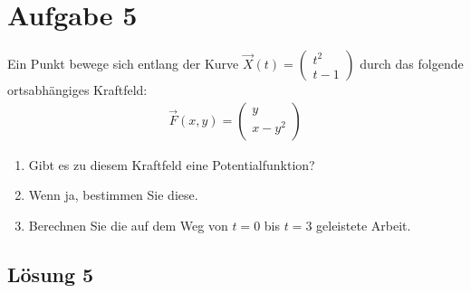 \documentclass[main.tex]{subfiles}
\begin{document}
\section{Aufgabe 5}
Ein Punkt bewege sich entlang der Kurve 
$\vec{X}(t) = \begin{pmatrix} t^{2} \\ t-1 \end{pmatrix}$
durch das folgende ortsabhängiges Kraftfeld:
\begin{align*}
    \vec{F}(x,y) = \begin{pmatrix} y \\ x-y^2 \end{pmatrix}
\end{align*}
\begin{enumerate}
    \item Gibt es zu diesem Kraftfeld eine Potentialfunktion?
    \item Wenn ja, bestimmen Sie diese.
    \item Berechnen Sie die auf dem Weg von $t=0$ bis $t=3$ geleistete Arbeit.
\end{enumerate}

\subsection{Lösung 5}
\end{document}
